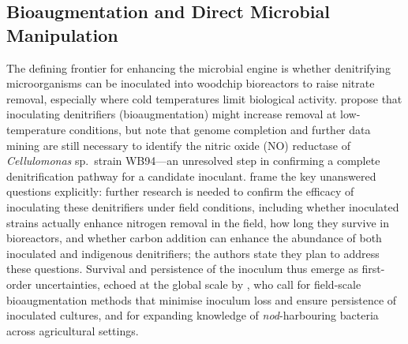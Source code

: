 \documentclass[11pt]{article}
\begin{document}
\subsection{Bioaugmentation and Direct Microbial Manipulation}
The defining frontier for enhancing the microbial engine is whether denitrifying microorganisms can be inoculated into woodchip bioreactors to raise nitrate removal, especially where cold temperatures limit biological activity. \textcite{Jang2019} propose that inoculating denitrifiers (bioaugmentation) might increase removal at low-temperature conditions, but note that genome completion and further data mining are still necessary to identify the nitric oxide (NO) reductase of \emph{Cellulomonas} sp.\ strain WB94---an unresolved step in confirming a complete denitrification pathway for a candidate inoculant. \textcite{Anderson2020} frame the key unanswered questions explicitly: further research is needed to confirm the efficacy of inoculating these denitrifiers under field conditions, including whether inoculated strains actually enhance nitrogen removal in the field, how long they survive in bioreactors, and whether carbon addition can enhance the abundance of both inoculated and indigenous denitrifiers; the authors state they plan to address these questions. Survival and persistence of the inoculum thus emerge as first-order uncertainties, echoed at the global scale by \textcite{Wang2025b}, who call for field-scale bioaugmentation methods that minimise inoculum loss and ensure persistence of inoculated cultures, and for expanding knowledge of \emph{nod}-harbouring bacteria across agricultural settings.
\end{document}
